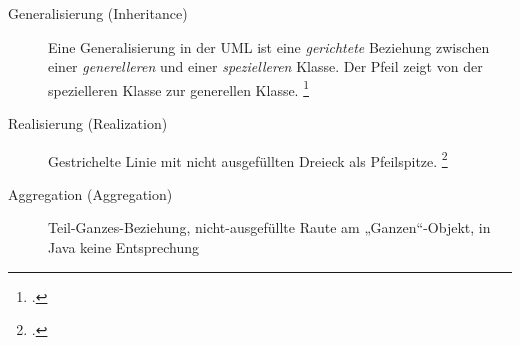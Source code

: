 \documentclass{bschlangaul-haupt}
\begin{document}
\begin{description}
\begin{center}
\end{center}

%

\item[Generalisierung (Inheritance)]

Eine Generalisierung in der UML ist
eine \emph{gerichtete} Beziehung zwischen einer \emph{generelleren} und
einer \emph{spezielleren} Klasse. Der Pfeil zeigt von der spezielleren
Klasse zur generellen Klasse.
\footcite[Kapitel 6.4.6 Generalisierung, Seite 135]{rupp}

\begin{center}
\end{center}

\item[Realisierung (Realization)] Gestrichelte Linie mit nicht
ausgefüllten Dreieck als Pfeilspitze. 
\footcite[Kapitel 6.4.13, Seite 164]{rupp}

\begin{center}
\end{center}

%

\item[Aggregation (Aggregation)]

Teil-Ganzes-Beziehung, nicht-ausgefüllte Raute am „Ganzen“-Objekt,
in Java keine Entsprechung

\begin{center}
\end{center}


\end{description}
\end{document}
